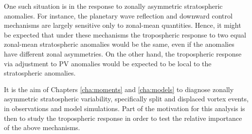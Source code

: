 One such situation is in the response to zonally asymmetric stratospheric
anomalies. For instance, the planetary wave reflection and downward control
mechanisms are largely sensitive only to zonal-mean quantities. Hence, it might
be expected that under these mechanisms the tropospheric response to two equal
zonal-mean stratospheric anomalies would be the same, even if the anomalies have
different zonal asymmetries. On the other hand, the tropospheric response via
adjustment to PV anomalies would be expected to be local to the stratospheric
anomalies.

It is the aim of Chapters \ref{cha:moments} and \ref{cha:models} to diagnose
zonally asymmetric stratospheric variability, specifically split and displaced
vortex events, in observations and model simulations. Part of the motivation for
this analysis is then to study the tropospheric response in order to test the
relative importance of the above mechanisms.













